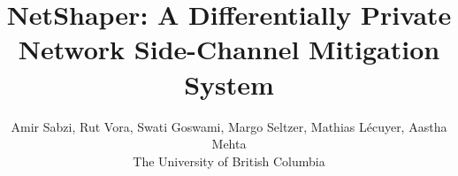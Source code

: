 \documentclass[letterpaper,twocolumn,10pt]{article}
\theoremstyle{TheoremNum}
\newcommand{\sys}{{NetShaper}}
\newcommand{\1}{\mathds{1}}
\newcommand{\todo}[1]{{#1}}
\begin{document}
\title{\Large \bf \sys: A Differentially Private Network Side-Channel Mitigation
System}
\author{Amir Sabzi, Rut Vora, Swati Goswami, Margo Seltzer, Mathias L\'ecuyer,
Aastha Mehta\\
    The University of British Columbia
}
\date{} \thispagestyle{empty}

\maketitle

\begin{abstract}

\end{abstract}



%
%

%

%
%


%





{
\footnotesize


}
%


\appendix






\end{document}
